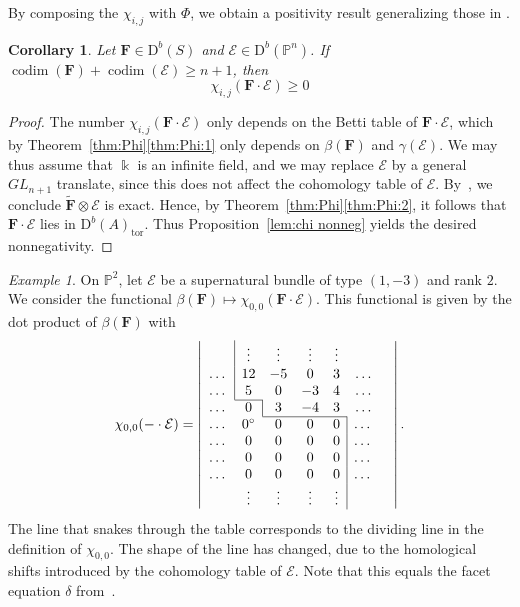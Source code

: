 \documentclass[12pt]{amsart}
\newtheorem{cor}[lemma]{Corollary}
\theoremstyle{definition}
\theoremstyle{remark}
\newtheorem{example}[lemma]{Example}
\newcommand{\kk}{\Bbbk}
\newcommand{\codim}{\operatorname{codim}}
\newcommand{\PP}{\mathbb{P}}
\newcommand{\cE}{\mathcal{E}}
\newcommand{\FF}{\mathbf{F}}
\newcommand{\GL}{{GL}}
\newcommand{\zp}{\circ}
\newcommand{\DD}{\mathrm{D}}
\begin{document}
By composing the $\chi_{i,j}$ with $\Phi$, we obtain a positivity result generalizing those in \cite[\S4]{eis-schrey1}.

\begin{cor}\label{thm:categorified}\label{thm:categorified:1}  Let $\FF\in \DD^b(S)$ and $\cE\in \DD^b(\PP^n)$. If  $\codim(\FF)+\codim(\cE)\geq n+1$, then
\[
\chi_{i,j}(\FF\cdot \cE)\geq 0
\]
\end{cor}

\begin{proof}
The number $\chi_{i,j}(\FF\cdot \cE)$ only depends on the Betti table of $\FF\cdot \cE$, which by Theorem~\ref{thm:Phi}\eqref{thm:Phi:1} only depends on $\beta(\FF)$ and $\gamma(\cE)$.  We may thus assume that $\kk$ is an infinite field, and we may replace $\cE$ by a general $\GL_{n+1}$ translate, since this does not affect the cohomology table of $\cE$.  By~\cite[Theorem, p.\ 335]{miller-speyer}, we  conclude $\widetilde{\FF}\otimes \cE$ is exact.  Hence, by Theorem~\ref{thm:Phi}\eqref{thm:Phi:2}, it follows that $\FF\cdot \cE$ lies in $\DD^b(A)_{\text{tor}}$.  Thus Proposition~\ref{lem:chi nonneg} yields the desired nonnegativity.
\end{proof}


\begin{example}\label{ex:sup2}
On $\PP^2$, let $\cE$ be a supernatural bundle of type $(1,-3)$ and rank $2$.  
We consider the functional $\beta(\FF)\mapsto \chi_{0,0}(\FF\cdot \cE)$.  This functional is given by the dot product of $\beta(\FF)$ with
\[
\chi_{0,0}(-\cdot \cE)=
\left|
\begin{array}{ccccccc}
&\multicolumn{1}{|c}{\vdots}&\vdots&\vdots&\vdots&&\\
\dots&\multicolumn{1}{|c}{12}&-5&0&3&\dots\\
\dots&\multicolumn{1}{|c}{5}&0&-3&4&\dots\\ \cline{2-2}
\dots&{0}&\multicolumn{1}{|c}{3}&-4&3&\dots\\ \cline{3-5}
\dots&0^\zp&0&0&{0}&\multicolumn{1}{|c}{\dots}\\
\dots&0&0&0&0&\multicolumn{1}{|c}{\dots}\\
\dots&0&0&0&0&\multicolumn{1}{|c}{\dots}\\
\dots&0&0&0&0&\multicolumn{1}{|c}{\dots}\\
&\vdots&\vdots&\vdots&\vdots&\multicolumn{1}{|c}{}&\\
\end{array}
\right|.
\]
The line that snakes through the table corresponds to the dividing line in the definition of $\chi_{0,0}$. The shape of the line has changed, due to the homological shifts introduced by the cohomology table of $\cE$.  Note that this equals the facet equation $\delta$ from~\cite[\S3]{eis-schrey-icm}.
\end{example}
\end{document}
